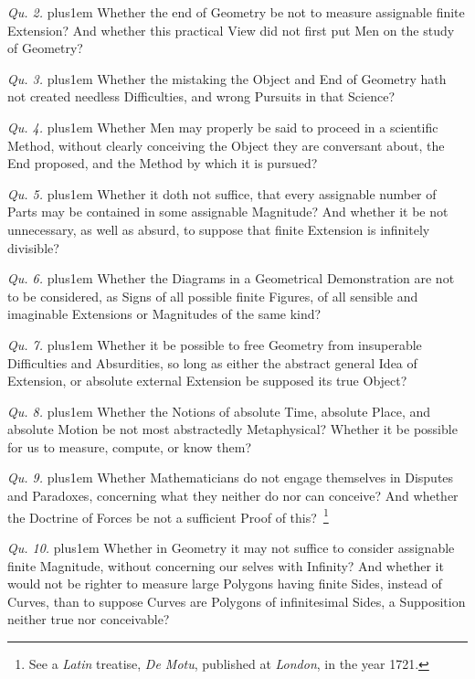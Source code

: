 \item{\it Qu. 2.} \hskip 0pt plus1em
Whether the end of Geometry be not to measure assignable finite
Extension?  And whether this practical View did not first put Men
on the study of Geometry?

\item{\it Qu. 3.} \hskip 0pt plus1em
Whether the mistaking the Object and End of Geometry hath not
created needless Difficulties, and wrong Pursuits in that
Science?

\item{\it Qu. 4.} \hskip 0pt plus1em
Whether Men may properly be said to proceed in a scientific
Method, without clearly conceiving the Object they are conversant
about, the End proposed, and the Method by which it is pursued?

\item{\it Qu. 5.} \hskip 0pt plus1em
Whether it doth not suffice, that every assignable number of
Parts may be contained in some assignable Magnitude?  And whether
it be not unnecessary, as well as absurd, to suppose that finite
Extension is infinitely divisible?

\item{\it Qu. 6.} \hskip 0pt plus1em
Whether the Diagrams in a Geometrical Demonstration are not to be
considered, as Signs of all possible finite Figures, of all
sensible and imaginable Extensions or Magnitudes of the same
kind?

\item{\it Qu. 7.} \hskip 0pt plus1em
Whether it be possible to free Geometry from insuperable
Difficulties and Absurdities, so long as either the abstract
general Idea of Extension, or absolute external Extension be
supposed its true Object?

\item{\it Qu. 8.} \hskip 0pt plus1em
Whether the Notions of absolute Time, absolute Place, and
absolute Motion be not most abstractedly Metaphysical?  Whether
it be possible for us to measure, compute, or know them?

\item{\it Qu. 9.} \hskip 0pt plus1em
Whether Mathematicians do not engage themselves in Disputes and
Paradoxes, concerning what they neither do nor can conceive?  And
whether the Doctrine of Forces be not a sufficient Proof of
this?~\footnote*{See a {\it Latin\/} treatise, {\it De Motu},
published at {\it London}, in the year 1721.}

\item{\it Qu. 10.} \hskip 0pt plus1em
Whether in Geometry it may not suffice to consider assignable
finite Magnitude, without concerning our selves with Infinity?
And whether it would not be righter to measure large Polygons
having finite Sides, instead of Curves, than to suppose Curves
are Polygons of infinitesimal Sides, a Supposition neither true
nor conceivable?

